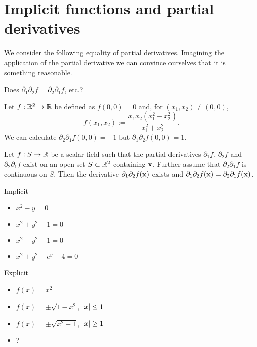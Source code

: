 \section{Implicit functions and partial derivatives}


We consider the following equality of partial derivatives.
Imagining the application of the partial derivative we can convince ourselves that it is something reasonable.

Does \(\partial_1\partial_2 f = \partial_2\partial_1 f\), etc.?

\begin{example*}
    Let \(f:\mathbb{R}^2 \to \mathbb{R}\) be defined as \(f(0,0)=0\) and, for \((x_1,x_2)\neq (0,0)\),
    \[
        f(x_1,x_2) := \frac{x_1x_2(x_1^2 - x_2^2)}{x_1^2 + x_2^2}.
    \]
    We can calculate \(\partial_2\partial_1 f (0,0) = -1\) but
    \(\partial_1\partial_2 f(0,0) = 1\).
\end{example*}

\begin{theorem}
    Let \(f:S\to\mathbb{R}\) be a scalar field such that the partial derivatives \(\partial_1 f\), \(\partial_2 f\) and \(\partial_2\partial_1 f\) exist on an open set \(S\subset \mathbb{R}^2\) containing \(\mathbf{x}\).
    Further assume that \(\partial_2\partial_1 f\) is continuous on \(S\).
    Then the derivative \(\partial_1\partial_2 f(\mathbf{x})\) exists and \(\partial_1\partial_2 f(\mathbf{x})=\partial_2\partial_1 f(\mathbf{x})\).
\end{theorem}









Implicit
\begin{itemize}
    \item \(x^2-y=0\)
    \item \(x^2+y^2-1=0\)
    \item \(x^2-y^2-1=0\)
    \item \(x^2+y^2-e^y -4 =0\)
\end{itemize}

Explicit
\begin{itemize}
    \item \(f(x) = x^2\)
    \item \(f(x) = \pm \sqrt{1-x^2}\), \(\left|x\right|\leq 1\)
    \item \(f(x) = \pm \sqrt{x^2-1}\), \(\left|x\right|\geq 1\)
    \item ?
\end{itemize}





